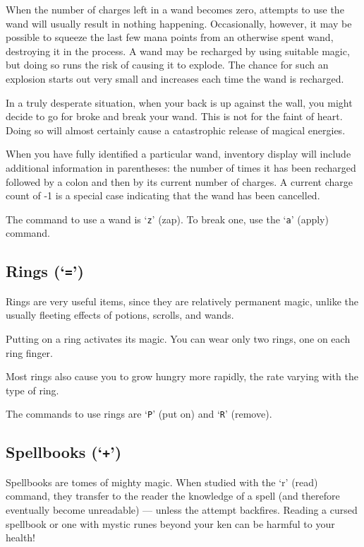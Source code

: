 When the number of charges left in a wand becomes zero, attempts to use the
wand will usually result in nothing happening.  Occasionally, however, it may
be possible to squeeze the last few mana points from an otherwise spent wand,
destroying it in the process.  A wand may be recharged by using suitable
magic, but doing so runs the risk of causing it to explode.  The chance
for such an explosion starts out very small and increases each time the
wand is recharged.

In a truly desperate situation, when your back is up against the wall, you
might decide to go for broke and break your wand.  This is not for the faint
of heart.  Doing so will almost certainly cause a catastrophic release of
magical energies.

When you have fully identified a particular wand, inventory display will
include additional information in parentheses: the number of times it has
been recharged followed by a colon and then by its current number of charges.
A current charge count of -1 is a special case indicating that the wand
has been cancelled.

The command to use a wand is `{\tt z}' (zap).  To break one, use the `{\tt a}'
(apply)
command.
\subsection*{Rings (`{\tt =}')}

Rings are very useful items, since they are relatively permanent
magic, unlike the usually fleeting effects of potions, scrolls, and
wands.

Putting on a ring activates its magic.  You can wear only two
rings, one on each ring finger.

Most rings also cause you to grow hungry more rapidly, the rate
varying with the type of ring.  

The commands to use rings are `{\tt P}' (put on) and `{\tt R}' (remove).
\subsection*{Spellbooks (`{\tt +}')}

Spellbooks are tomes of mighty magic.  When studied with the `r' (read)
command, they transfer to the reader the knowledge of a spell (and
therefore eventually become unreadable) --- unless the attempt backfires.
Reading a cursed spellbook or one with mystic runes beyond
your ken can be harmful to your health!

